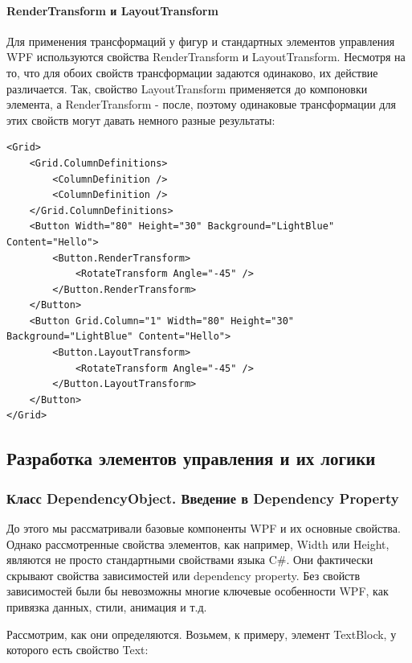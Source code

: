 \paragraph{RenderTransform и LayoutTransform}
Для применения трансформаций у фигур и стандартных элементов управления WPF используются свойства RenderTransform и LayoutTransform. Несмотря на то, что для обоих свойств трансформации задаются одинаково, их действие различается. Так, свойство LayoutTransform применяется до компоновки элемента, а RenderTransform - после, поэтому одинаковые трансформации для этих свойств могут давать немного разные результаты:

\begin{verbatim}
<Grid>
    <Grid.ColumnDefinitions>
        <ColumnDefinition />
        <ColumnDefinition />
    </Grid.ColumnDefinitions>
    <Button Width="80" Height="30" Background="LightBlue" Content="Hello">
        <Button.RenderTransform>
            <RotateTransform Angle="-45" />
        </Button.RenderTransform>
    </Button>
    <Button Grid.Column="1" Width="80" Height="30" Background="LightBlue" Content="Hello">
        <Button.LayoutTransform>
            <RotateTransform Angle="-45" />
        </Button.LayoutTransform>
    </Button>
</Grid>
\end{verbatim}

\subsection{Разработка элементов управления и их логики}

\subsubsection{Класс DependencyObject. Введение в Dependency Property}

До этого мы рассматривали базовые компоненты WPF и их основные свойства. Однако рассмотренные свойства элементов, как например, Width или Height, являются не просто стандартными свойствами языка C#. Они фактически скрывают свойства зависимостей или dependency property. Без свойств зависимостей были бы невозможны многие ключевые особенности WPF, как привязка данных, стили, анимация и т.д.

Рассмотрим, как они определяются. Возьмем, к примеру, элемент TextBlock, у которого есть свойство Text:

